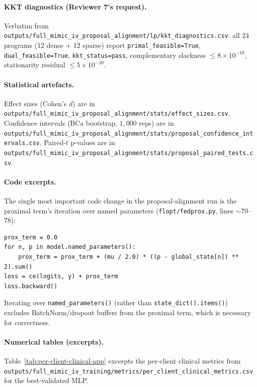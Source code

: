 \paragraph{KKT diagnostics (Reviewer 7's request).}
Verbatim from \texttt{outputs/full\_mimic\_iv\_proposal\_alignment/lp/kkt\_diagnostics.csv}:
all $24$ programs (12 dense $+$ 12 sparse) report \texttt{primal\_feasible=True},
\texttt{dual\_feasible=True}, \texttt{kkt\_status=pass}, complementary
slackness $\leq 8\!\times\!10^{-10}$, stationarity residual $\leq 5\!\times\!10^{-10}$.

\paragraph{Statistical artefacts.}
Effect sizes (Cohen's $d$) are in
\texttt{outputs/full\_mimic\_iv\_proposal\_alignment/stats/effect\_sizes.csv}.
Confidence intervals (BCa bootstrap, $1{,}000$ reps) are in
\texttt{outputs/full\_mimic\_iv\_proposal\_alignment/stats/proposal\_confidence\_intervals.csv}.
Paired-$t$ p-values are in
\texttt{outputs/full\_mimic\_iv\_proposal\_alignment/stats/proposal\_paired\_tests.csv}.

\paragraph{Code excerpts.} The single most important code change in the
proposal-alignment run is the proximal term's iteration over named
parameters (\texttt{flopt/fedprox.py}, lines $\sim$$70$--$78$):
\begin{lstlisting}
prox_term = 0.0
for n, p in model.named_parameters():
    prox_term = prox_term + (mu / 2.0) * ((p - global_state[n]) ** 2).sum()
loss = ce(logits, y) + prox_term
loss.backward()
\end{lstlisting}
Iterating over \texttt{named\_parameters()} (rather than
\texttt{state\_dict().items()}) excludes BatchNorm/dropout buffers from the
proximal term, which is necessary for correctness.

\paragraph{Numerical tables (excerpts).}
Table~\ref{tab:per-client-clinical-app} excerpts the per-client clinical
metrics from
\texttt{outputs/full\_mimic\_iv\_training/metrics/per\_client\_clinical\_metrics.csv}
for the best-validated MLP.

